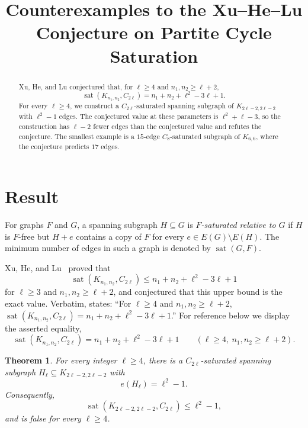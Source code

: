 \documentclass[11pt]{amsart}
\title[The Xu--He--Lu partite saturation conjecture]
{Counterexamples to the Xu--He--Lu Conjecture on Partite Cycle Saturation}
\date{}
\newtheorem{theorem}{Theorem}
\newcommand{\sat}{\operatorname{sat}}
\begin{document}
\begin{abstract}
Xu, He, and Lu conjectured that, for $\ell\ge 4$ and
$n_1,n_2\ge \ell+2$,
\[
\sat(K_{n_1,n_2},C_{2\ell})
 =n_1+n_2+\ell^2-3\ell+1.
\]
For every $\ell\ge 4$, we construct a $C_{2\ell}$-saturated spanning
subgraph of $K_{2\ell-2,2\ell-2}$ with $\ell^2-1$ edges. The
conjectured value at these parameters is $\ell^2+\ell-3$, so the
construction has $\ell-2$ fewer edges than the conjectured value and
refutes the conjecture. The smallest example is a $15$-edge
$C_8$-saturated subgraph of $K_{6,6}$, where the conjecture predicts
$17$ edges.
\end{abstract}

\maketitle

\section{Result}\label{sec:result}

For graphs $F$ and $G$, a spanning subgraph $H\subseteq G$ is
\emph{$F$-saturated relative to $G$} if $H$ is $F$-free but $H+e$
contains a copy of $F$ for every $e\in E(G)\setminus E(H)$. The
minimum number of edges in such a graph is denoted by $\sat(G,F)$.

Xu, He, and Lu~\cite[Theorem~1.1]{XHL} proved that
\begin{equation}\label{eq:XHLupper}
\sat(K_{n_1,n_2},C_{2\ell})
 \le n_1+n_2+\ell^2-3\ell+1
\end{equation}
for $\ell\ge 3$ and $n_1,n_2\ge \ell+2$, and conjectured that this
upper bound is the exact value. Verbatim,
\cite[Conjecture~6.2]{XHL} states: ``For $\ell\ge 4$ and
$n_1,n_2\ge \ell+2$,
$\sat(K_{n_1,n_2},C_{2\ell})=n_1+n_2+\ell^2-3\ell+1$.'' For reference
below we display the asserted equality,
\begin{equation}\label{eq:XHL}
\sat(K_{n_1,n_2},C_{2\ell})
 =n_1+n_2+\ell^2-3\ell+1
\qquad(\ell\ge 4,\ n_1,n_2\ge \ell+2).
\end{equation}

\begin{theorem}\label{thm:main}
For every integer $\ell\ge 4$, there is a $C_{2\ell}$-saturated
spanning subgraph $H_\ell\subseteq K_{2\ell-2,2\ell-2}$ with
\[
e(H_\ell)=\ell^2-1.
\]
Consequently,
\[
\sat(K_{2\ell-2,2\ell-2},C_{2\ell})\le \ell^2-1,
\]
and \cite[Conjecture~6.2]{XHL} is false for every $\ell\ge 4$.
\end{theorem}
\end{document}
